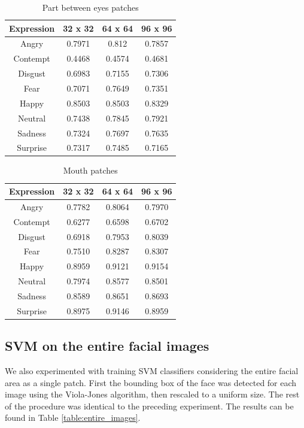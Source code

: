 \begin{table}
\caption{Part between eyes patches}
\label{table:between_eyes}

\begin{tabular}{| c | c | c | c |}
\hline
Expression & 32 x 32 &  64 x 64  & 96 x 96  \\

\hline
Angry & 0.7971 & 0.812 & 0.7857 \\
Contempt & 0.4468 & 0.4574 & 0.4681 \\
Disgust & 0.6983 & 0.7155 & 0.7306 \\
Fear & 0.7071 & 0.7649 & 0.7351 \\
Happy & 0.8503 & 0.8503 & 0.8329 \\
Neutral & 0.7438 & 0.7845 & 0.7921 \\
Sadness & 0.7324 & 0.7697 & 0.7635 \\
Surprise & 0.7317 & 0.7485 & 0.7165 \\

\hline
\end{tabular}
\end{table}


\begin{table}
\caption{Mouth patches}
\label{table:mouth}

\begin{tabular}{| c | c | c | c |}
\hline
Expression & 32 x 32 &  64 x 64  & 96 x 96  \\

\hline
Angry	&	0.7782	&	0.8064	&	0.7970	\\
Contempt	&	0.6277	&	0.6598	& 0.6702 \\
Disgust	&	0.6918	&	0.7953	&	0.8039	\\
Fear	&	0.7510	&	0.8287	&	0.8307	\\
Happy	&	0.8959	&	0.9121	&	0.9154	\\
Neutral	&	0.7974	&	0.8577	&	0.8501	\\
Sadness	&	0.8589	&	0.8651	&	0.8693	\\
Surprise &	0.8975	&	0.9146	&	0.8959	\\

\hline
\end{tabular}
\end{table}

\subsection{SVM on the entire facial images}
We also experimented with training SVM classifiers considering the entire facial area as a single patch. First the bounding box of the face was detected
for each image using the Viola-Jones algorithm, then rescaled to a uniform size. %
The rest of the procedure was identical to the preceding experiment. The results can be found in Table \ref{table:entire_images}.


